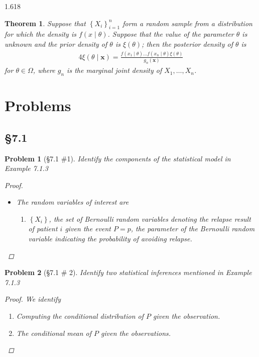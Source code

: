 \documentclass[11pt, oneside]{book}   	%
\newtheorem{theorem}{Theorem}[chapter]
\newtheorem{problem}{Problem}[section]
\newcommand{\set}[1]{\left\{#1\right\}}
\begin{document}
\begin{spacing}{1.618}
		\begin{theorem}
			Suppose that $\set{X_i}_{i=1}^n$ form a random sample from a distribution for which the density is $f(x\mid \theta)$. Suppose that the value of the parameter $\theta$ is unknown and the prior density of $\theta$ is $\xi(\theta)$; then the posterior density of $\theta$ is 
			\begin{alignat}{4}
				\xi(\theta\mid \mathbf{x})=\frac{f(x_1\mid\theta)\dots f(x_n\mid\theta)\xi(\theta)}{g_n(\mathbf{x})}
			\end{alignat}
			for $\theta\in\Omega$, where $g_n$ is the marginal joint density of $X_1, \dots, X_n$. 
		\end{theorem}
		
	\section{Problems}
	
		\subsection{\S 7.1}
				
			\begin{problem}[\S 7.1 \#1]
				Identify the components of the statistical model in Example 7.1.3
				\begin{proof}
					\begin{itemize}
						\item The random variables of interest are 
						\begin{enumerate}
							\item $\set{X_i}$, the set of Bernoulli random variables denoting the relapse result of patient $i$ given the event ${P=p}$, the parameter of the Bernoulli random variable indicating the probability of avoiding relapse. 
						\end{enumerate}
					\end{itemize}
				\end{proof}
			\end{problem}
		
		
			\begin{problem}[\S 7.1 \# 2]
				Identify two statistical inferences mentioned in Example 7.1.3
				\begin{proof}
					We identify
					\begin{enumerate}
						\item Computing the conditional distribution of $P$ given the observation. 
						\item The conditional mean of $P$ given the observations. 
					\end{enumerate}
				\end{proof}
			\end{problem}


\end{spacing}
\end{document}
